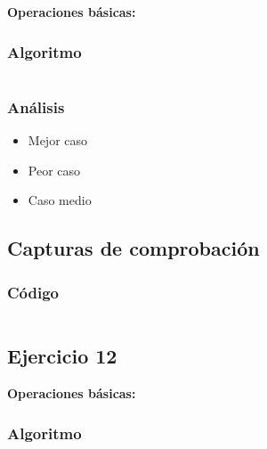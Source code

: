 \documentclass[12pt, letterpaper]{article}			%
\begin{document}
		\textbf{Operaciones básicas:}
			\subsubsection{Algoritmo}
			    \begin{lstlisting}[style=Java]
    		    \end{lstlisting}

			\subsubsection{Análisis}
	    		\begin{itemize}
	    			\item[\Checklist] Mejor caso \\

	    			\item[\Checklist] Peor caso \\
					
					\item[\Checklist] Caso medio \\

				\end{itemize}	        
	        \subsection{Capturas de comprobación}

	        \subsubsection{Código}
	            \begin{lstlisting}[style=Java]
    		    \end{lstlisting}

	    \subsection{Ejercicio 12}
		\textbf{Operaciones básicas:}
		
			\subsubsection{Algoritmo}
			    \begin{lstlisting}[style=Java]
    		    \end{lstlisting}
\end{document}
